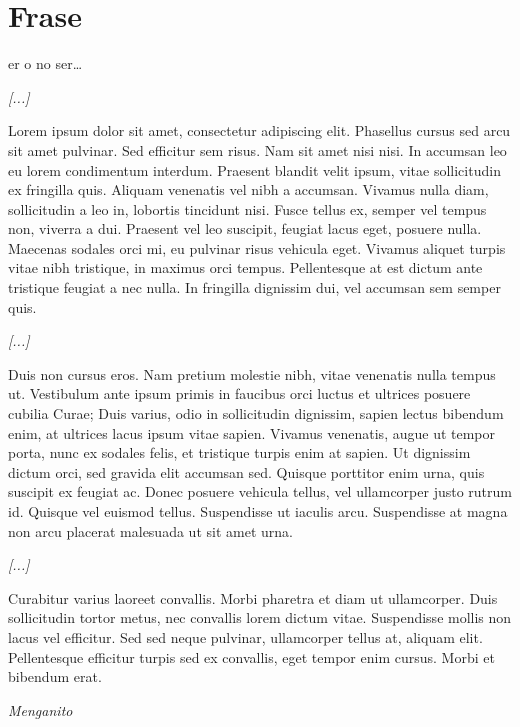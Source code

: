 \chapter*{Frase}
\begin{SingleSpace}
er o no ser…
\begin{center}
\textit{[...]}
\end{center}

Lorem ipsum dolor sit amet, consectetur adipiscing elit. Phasellus cursus sed arcu sit amet pulvinar. Sed efficitur sem risus. Nam sit amet nisi nisi. In accumsan leo eu lorem condimentum interdum. Praesent blandit velit ipsum, vitae sollicitudin ex fringilla quis. Aliquam venenatis vel nibh a accumsan. Vivamus nulla diam, sollicitudin a leo in, lobortis tincidunt nisi. Fusce tellus ex, semper vel tempus non, viverra a dui. Praesent vel leo suscipit, feugiat lacus eget, posuere nulla. Maecenas sodales orci mi, eu pulvinar risus vehicula eget. Vivamus aliquet turpis vitae nibh tristique, in maximus orci tempus. Pellentesque at est dictum ante tristique feugiat a nec nulla. In fringilla dignissim dui, vel accumsan sem semper quis.
\begin{center}
\textit{[...]}
\end{center}

Duis non cursus eros. Nam pretium molestie nibh, vitae venenatis nulla tempus ut. Vestibulum ante ipsum primis in faucibus orci luctus et ultrices posuere cubilia Curae; Duis varius, odio in sollicitudin dignissim, sapien lectus bibendum enim, at ultrices lacus ipsum vitae sapien. Vivamus venenatis, augue ut tempor porta, nunc ex sodales felis, et tristique turpis enim at sapien. Ut dignissim dictum orci, sed gravida elit accumsan sed. Quisque porttitor enim urna, quis suscipit ex feugiat ac. Donec posuere vehicula tellus, vel ullamcorper justo rutrum id. Quisque vel euismod tellus. Suspendisse ut iaculis arcu. Suspendisse at magna non arcu placerat malesuada ut sit amet urna.

\begin{center}
\textit{[...]}
\end{center}

Curabitur varius laoreet convallis. Morbi pharetra et diam ut ullamcorper. Duis sollicitudin tortor metus, nec convallis lorem dictum vitae. Suspendisse mollis non lacus vel efficitur. Sed sed neque pulvinar, ullamcorper tellus at, aliquam elit. Pellentesque efficitur turpis sed ex convallis, eget tempor enim cursus. Morbi et bibendum erat.


\begin{flushright}
\textit{Menganito}
\end{flushright}
\end{SingleSpace}
\clearpage